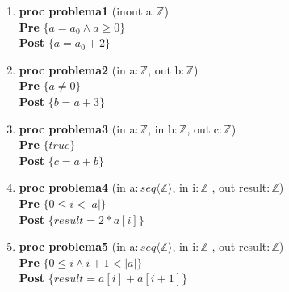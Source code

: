 \documentclass{article}
\begin{document}
\begin{enumerate}[label=\alph*)]
\item \textbf{proc problema1 }(inout a$:\mathbb{Z}$) {\\
   \hspace*{6mm} \textbf{Pre }$\{a = a_0 \wedge a \geq 0\}$\\
   \hspace*{6mm} \textbf{Post }$\{a = a_0 + 2\}$\\
   }

\item \textbf{proc problema2 }(in a$:\mathbb{Z}$, out b$:\mathbb{Z}$) {\\
   \hspace*{6mm} \textbf{Pre }$\{a \neq 0\}$\\
   \hspace*{6mm} \textbf{Post }$\{b = a + 3\}$\\
   }

\item \textbf{proc problema3 }(in a$:\mathbb{Z}$, in b$:\mathbb{Z}$, out c$:\mathbb{Z}$) {\\
   \hspace*{6mm} \textbf{Pre }$\{true\}$\\
   \hspace*{6mm} \textbf{Post }$\{c = a + b\}$\\
   }

\item \textbf{proc problema4 }(in a$: seq\langle \mathbb{Z}\rangle$, in i$:\mathbb{Z}$
	, out result$: \mathbb{Z}$) {\\
   \hspace*{6mm} \textbf{Pre }$\{0 \leq i < |a|\}$\\
   \hspace*{6mm} \textbf{Post }$\{result = 2 * a[i]\}$\\
   }

\item \textbf{proc problema5 }(in a$: seq\langle \mathbb{Z}\rangle$, in i$:\mathbb{Z}$
	, out result$: \mathbb{Z}$) {\\
   \hspace*{6mm} \textbf{Pre }$\{0 \leq i \wedge i + 1 < |a|\}$\\
   \hspace*{6mm} \textbf{Post }$\{result = a[i] + a[i + 1]\}$\\
   }
\end{enumerate}
\end{document}
